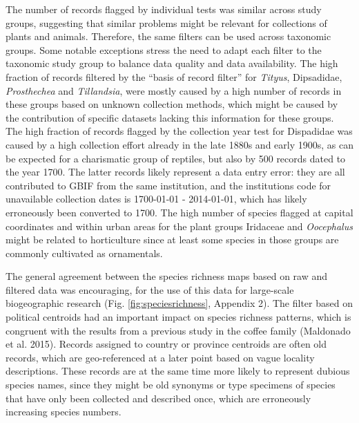\documentclass[fleqn,10pt,lineno]{wlpeerj} %
\begin{document}
The number of records flagged by individual tests was similar across study groups, suggesting that similar problems might be relevant for collections of plants and animals. Therefore, the same filters can be used across taxonomic groups. Some notable exceptions stress the need to adapt each filter to the taxonomic study group to balance data quality and data availability. The high fraction of records filtered by the ``basis of record filter'' for \emph{Tityus}, Dipsadidae, \emph{Prosthechea} and \emph{Tillandsia}, were mostly caused by a high number of records in these groups based on unknown collection methods, which might be caused by the contribution of specific datasets lacking this information for these groups. The high fraction of records flagged by the collection year test for Dispadidae was caused by a high collection effort already in the late 1880s and early 1900s, as can be expected for a charismatic group of reptiles, but also by 500 records dated to the year 1700. The latter records likely represent a data entry error: they are all contributed to GBIF from the same institution, and the institutions code for unavailable collection dates is 1700-01-01 - 2014-01-01, which has likely erroneously been converted to 1700. The high number of species flagged at capital coordinates and within urban areas for the plant groups Iridaceae and \emph{Oocephalus} might be related to horticulture since at least some species in those groups are commonly cultivated as ornamentals.

The general agreement between the species richness maps based on raw and filtered data was encouraging, for the use of this data for large-scale biogeographic research (Fig. \ref{fig:speciesrichness}, Appendix 2). The filter based on political centroids had an important impact on species richness patterns, which is congruent with the results from a previous study in the coffee family (Maldonado et al. 2015). Records assigned to country or province centroids are often old records, which are geo-referenced at a later point based on vague locality descriptions. These records are at the same time more likely to represent dubious species names, since they might be old synonyms or type specimens of species that have only been collected and described once, which are erroneously increasing species numbers.
\end{document}

